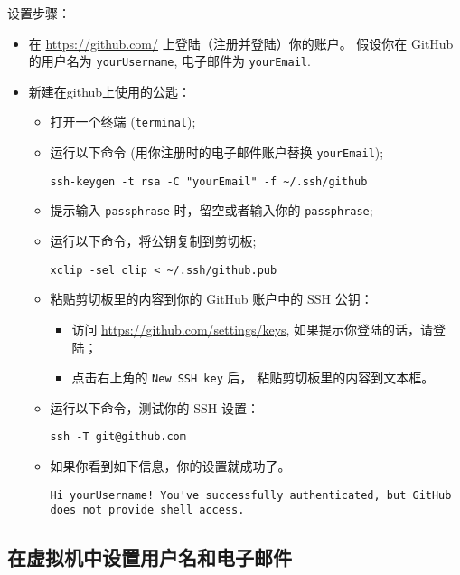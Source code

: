 \documentclass[
    11pt,
    base=hide,
    cite=authoryear,
    device=phone,
    lang=cn,
    mode=simple,
    result=answer,
    toc=onecol,
]{elegantbook_sierxue}
\begin{document}
设置步骤：
\begin{itemize}
    \item 在 \href{https://github.com/}{https://github.com/}
        上登陆（注册并登陆）你的账户。
        假设你在 GitHub 的用户名为 \lstinline{yourUsername},
        电子邮件为 \lstinline{yourEmail}.
    \item 新建在github上使用的公匙：
        \begin{itemize}
            \item 打开一个终端 (\lstinline{terminal});
            \item 运行以下命令 (用你注册时的电子邮件账户替换
                \lstinline{yourEmail});
\begin{lstlisting}
ssh-keygen -t rsa -C "yourEmail" -f ~/.ssh/github
\end{lstlisting}
            \item 提示输入 \lstinline{passphrase}
                时，留空或者输入你的 \lstinline{passphrase};
            \item 运行以下命令，将公钥复制到剪切板;
\begin{lstlisting}
xclip -sel clip < ~/.ssh/github.pub
\end{lstlisting}
            \item 粘贴剪切板里的内容到你的 GitHub 账户中的 SSH 公钥：
                \begin{itemize}
                    \item 访问 \href{https://github.com/settings/keys}
                        {https://github.com/settings/keys},
                        如果提示你登陆的话，请登陆；
                    \item 点击右上角的 \lstinline{New SSH key} 后，
                        粘贴剪切板里的内容到文本框。
                \end{itemize}
            \item 运行以下命令，测试你的 SSH 设置：
\begin{lstlisting}
ssh -T git@github.com
\end{lstlisting}
            \item 如果你看到如下信息，你的设置就成功了。
\begin{lstlisting}
Hi yourUsername! You've successfully authenticated, but GitHub does not provide shell access.
\end{lstlisting}
        \end{itemize}
\end{itemize}

\subsection{在虚拟机中设置用户名和电子邮件}%
\label{sub:git-user-info}
\end{document}
